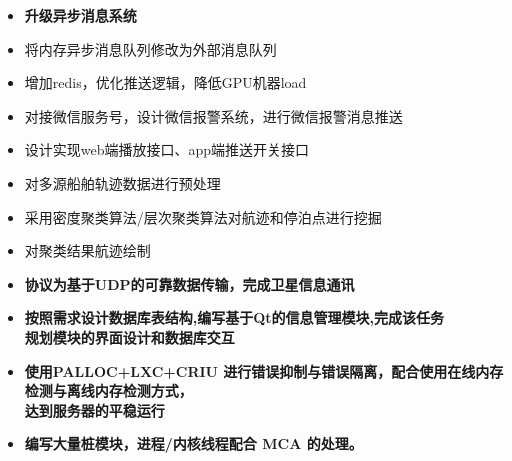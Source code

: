 \documentclass[10pt,a4paper]{altacv}
\begin{document}
\begin{itemize}
\item \textbf{升级异步消息系统}
\setlength{\itemindent}{.2in}
\item 将内存异步消息队列修改为外部消息队列
\item 增加redis，优化推送逻辑，降低GPU机器load
\setlength{\itemindent}{0in}
\item 对接微信服务号，设计微信报警系统，进行微信报警消息推送
\setlength{\itemindent}{.2in}
\item 设计实现web端播放接口、app端推送开关接口
\setlength{\itemindent}{0in}
\end{itemize}

\divider

\begin{itemize}
\item 对多源船舶轨迹数据进行预处理
\item 采用密度聚类算法/层次聚类算法对航迹和停泊点进行挖掘
\item 对聚类结果航迹绘制
\end{itemize}

\divider


\begin{itemize}
\item \textbf{协议为基于UDP的可靠数据传输，完成卫星信息通讯}
\item \textbf{按照需求设计数据库表结构,编写基于Qt的信息管理模块,完成该任务\\规划模块的界面设计和数据库交互}
\end{itemize}

\divider

\begin{itemize}
\item \textbf{使用PALLOC+LXC+CRIU 进行错误抑制与错误隔离，配合使用在线内存检测与离线内存检测方式，\\ 达到服务器的平稳运行}
\item \textbf{编写大量桩模块，进程/内核线程配合 MCA 的处理。}
\end{itemize}
\end{document}
